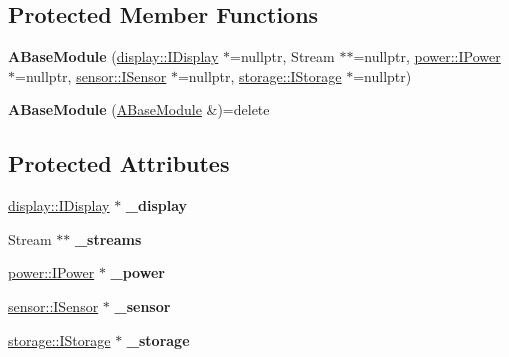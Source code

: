 \subsection*{Protected Member Functions}
\begin{DoxyCompactItemize}
\item 
\mbox{\label{classwood_box_1_1module_1_1_a_base_module_a40edd799ba7342abfaf5cb06e60a4b04}} 
{\bfseries A\+Base\+Module} (\mbox{\hyperlink{classwood_box_1_1display_1_1_i_display}{display\+::\+I\+Display}} $\ast$=nullptr, Stream $\ast$$\ast$=nullptr, \mbox{\hyperlink{classwood_box_1_1power_1_1_i_power}{power\+::\+I\+Power}} $\ast$=nullptr, \mbox{\hyperlink{classwood_box_1_1sensor_1_1_i_sensor}{sensor\+::\+I\+Sensor}} $\ast$=nullptr, \mbox{\hyperlink{classwood_box_1_1storage_1_1_i_storage}{storage\+::\+I\+Storage}} $\ast$=nullptr)
\item 
\mbox{\label{classwood_box_1_1module_1_1_a_base_module_a2ba8fdaace63960a0696b77bee60b64b}} 
{\bfseries A\+Base\+Module} (\mbox{\hyperlink{classwood_box_1_1module_1_1_a_base_module}{A\+Base\+Module}} \&)=delete
\end{DoxyCompactItemize}
\subsection*{Protected Attributes}
\begin{DoxyCompactItemize}
\item 
\mbox{\label{classwood_box_1_1module_1_1_a_base_module_a2550178f6fe0a97025e87da03a47d13f}} 
\mbox{\hyperlink{classwood_box_1_1display_1_1_i_display}{display\+::\+I\+Display}} $\ast$ {\bfseries \+\_\+display}
\item 
\mbox{\label{classwood_box_1_1module_1_1_a_base_module_a851b365cdd36435e017297fcfdb8d5e8}} 
Stream $\ast$$\ast$ {\bfseries \+\_\+streams}
\item 
\mbox{\label{classwood_box_1_1module_1_1_a_base_module_a24c92fcd213167f9f917d6637a8df370}} 
\mbox{\hyperlink{classwood_box_1_1power_1_1_i_power}{power\+::\+I\+Power}} $\ast$ {\bfseries \+\_\+power}
\item 
\mbox{\label{classwood_box_1_1module_1_1_a_base_module_a9735d9e5169f0d26c2a9cf2fad3f12a5}} 
\mbox{\hyperlink{classwood_box_1_1sensor_1_1_i_sensor}{sensor\+::\+I\+Sensor}} $\ast$ {\bfseries \+\_\+sensor}
\item 
\mbox{\label{classwood_box_1_1module_1_1_a_base_module_aa187748e43497da9786e37c777948901}} 
\mbox{\hyperlink{classwood_box_1_1storage_1_1_i_storage}{storage\+::\+I\+Storage}} $\ast$ {\bfseries \+\_\+storage}
\end{DoxyCompactItemize}


